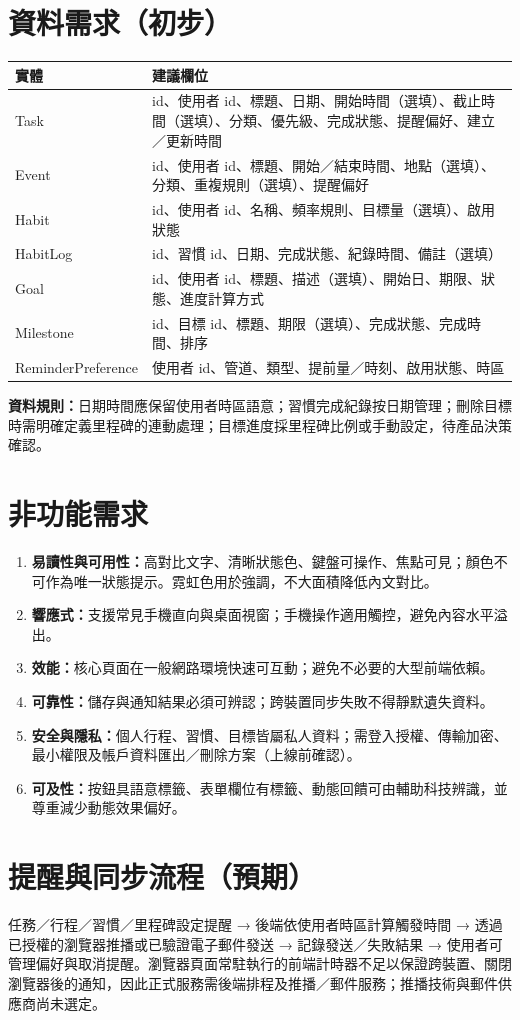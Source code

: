 \documentclass[12pt]{article}
\begin{document}
\section{資料需求（初步）}
\begin{longtable}{p{2.3cm}p{10.7cm}}\toprule
實體 & 建議欄位\\\midrule
Task & id、使用者 id、標題、日期、開始時間（選填）、截止時間（選填）、分類、優先級、完成狀態、提醒偏好、建立／更新時間\\
Event & id、使用者 id、標題、開始／結束時間、地點（選填）、分類、重複規則（選填）、提醒偏好\\
Habit & id、使用者 id、名稱、頻率規則、目標量（選填）、啟用狀態\\
HabitLog & id、習慣 id、日期、完成狀態、紀錄時間、備註（選填）\\
Goal & id、使用者 id、標題、描述（選填）、開始日、期限、狀態、進度計算方式\\
Milestone & id、目標 id、標題、期限（選填）、完成狀態、完成時間、排序\\
ReminderPreference & 使用者 id、管道、類型、提前量／時刻、啟用狀態、時區\\\bottomrule\end{longtable}
\textbf{資料規則：}日期時間應保留使用者時區語意；習慣完成紀錄按日期管理；刪除目標時需明確定義里程碑的連動處理；目標進度採里程碑比例或手動設定，待產品決策確認。
\section{非功能需求}
\begin{enumerate}
\item \textbf{易讀性與可用性：}高對比文字、清晰狀態色、鍵盤可操作、焦點可見；顏色不可作為唯一狀態提示。霓虹色用於強調，不大面積降低內文對比。
\item \textbf{響應式：}支援常見手機直向與桌面視窗；手機操作適用觸控，避免內容水平溢出。
\item \textbf{效能：}核心頁面在一般網路環境快速可互動；避免不必要的大型前端依賴。
\item \textbf{可靠性：}儲存與通知結果必須可辨認；跨裝置同步失敗不得靜默遺失資料。
\item \textbf{安全與隱私：}個人行程、習慣、目標皆屬私人資料；需登入授權、傳輸加密、最小權限及帳戶資料匯出／刪除方案（上線前確認）。
\item \textbf{可及性：}按鈕具語意標籤、表單欄位有標籤、動態回饋可由輔助科技辨識，並尊重減少動態效果偏好。
\end{enumerate}
\section{提醒與同步流程（預期）}
任務／行程／習慣／里程碑設定提醒 → 後端依使用者時區計算觸發時間 → 透過已授權的瀏覽器推播或已驗證電子郵件發送 → 記錄發送／失敗結果 → 使用者可管理偏好與取消提醒。瀏覽器頁面常駐執行的前端計時器不足以保證跨裝置、關閉瀏覽器後的通知，因此正式服務需後端排程及推播／郵件服務；推播技術與郵件供應商尚未選定。
\end{document}
